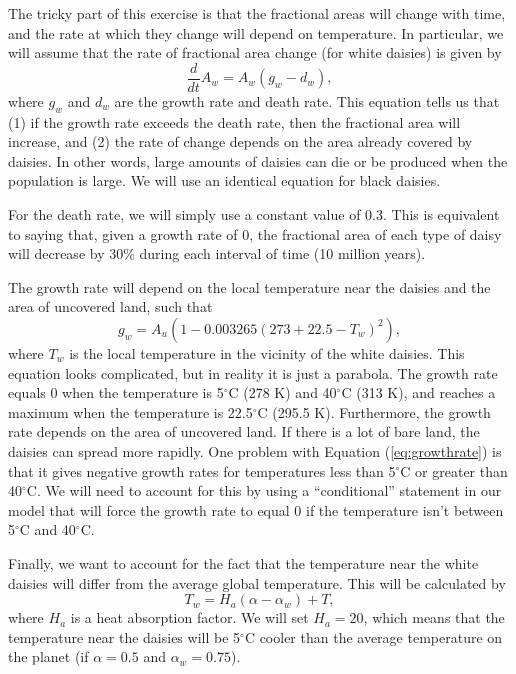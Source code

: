 \documentclass[11pt,letterpaper]{article}
\begin{document}
The tricky part of this exercise is that the fractional areas will change with time, and the rate at which they change will depend on temperature. In particular, we will assume that the rate of fractional area change (for white daisies) is given by
\begin{equation}
\frac{d}{dt}A_w=A_w(g_w-d_w),
\end{equation} 
where $g_w$ and $d_w$ are the growth rate and death rate. This equation tells us that (1) if the growth rate exceeds the death rate, then the fractional area will increase, and (2) the rate of change depends on the area already covered by daisies. In other words, large amounts of daisies can die or be produced when the population is large. We will use an identical equation for black daisies.

For the death rate, we will simply use a constant value of 0.3. This is equivalent to saying that, given a growth rate of 0, the fractional area of each type of daisy will decrease by 30\% during each interval of time (10 million years).

The growth rate will depend on the local temperature near the daisies and the area of uncovered land, such that
\begin{equation}
g_w=A_u(1-0.003265(273+22.5-T_w)^2),
\label{eq:growthrate}
\end{equation}
\noindent where $T_w$ is the local temperature in the vicinity of the white daisies. This equation looks complicated, but in reality it is just a parabola. The growth rate equals 0 when the temperature is 5$^\circ$C (278 K) and 40$^\circ$C (313 K), and reaches a maximum when the temperature is 22.5$^\circ$C (295.5 K). Furthermore, the growth rate depends on the area of uncovered land. If there is a lot of bare land, the daisies can spread more rapidly. One problem with Equation (\ref{eq:growthrate}) is that it gives negative growth rates for temperatures less than 5$^\circ$C or greater than 40$^\circ$C. We will need to account for this by using a ``conditional'' statement in our model that will force the growth rate to equal 0 if the temperature isn't between 5$^\circ$C and 40$^\circ$C.

Finally, we want to account for the fact that the temperature near the white daisies will differ from the average global temperature. This will be calculated by
\begin{equation}
T_w=H_a(\alpha-\alpha_w)+T,
\end{equation}
\noindent where $H_a$ is a heat absorption factor. We will set $H_a=20$, which means that the temperature near the daisies will be 5$^\circ$C cooler than the average temperature on the planet (if $\alpha=0.5$ and $\alpha_w=0.75$).
\end{document}
